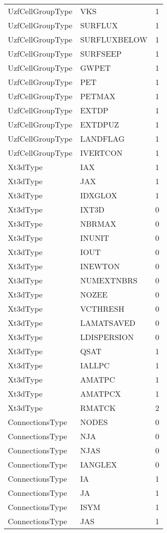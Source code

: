 \begin{longtable}{p{6cm} p{4cm} p{2cm} }
UzfCellGroupType &  VKS & 1 \\ 
UzfCellGroupType &  SURFLUX & 1 \\ 
UzfCellGroupType &  SURFLUXBELOW & 1 \\ 
UzfCellGroupType &  SURFSEEP & 1 \\ 
UzfCellGroupType &  GWPET & 1 \\ 
UzfCellGroupType &  PET & 1 \\ 
UzfCellGroupType &  PETMAX & 1 \\ 
UzfCellGroupType &  EXTDP & 1 \\ 
UzfCellGroupType &  EXTDPUZ & 1 \\ 
UzfCellGroupType &  LANDFLAG & 1 \\ 
UzfCellGroupType &  IVERTCON & 1 \\ 
Xt3dType &  IAX & 1 \\ 
Xt3dType &  JAX & 1 \\ 
Xt3dType &  IDXGLOX & 1 \\ 
Xt3dType &  IXT3D & 0 \\ 
Xt3dType &  NBRMAX & 0 \\ 
Xt3dType &  INUNIT & 0 \\ 
Xt3dType &  IOUT & 0 \\ 
Xt3dType &  INEWTON & 0 \\ 
Xt3dType &  NUMEXTNBRS & 0 \\ 
Xt3dType &  NOZEE & 0 \\ 
Xt3dType &  VCTHRESH & 0 \\ 
Xt3dType &  LAMATSAVED & 0 \\ 
Xt3dType &  LDISPERSION & 0 \\ 
Xt3dType &  QSAT & 1 \\ 
Xt3dType &  IALLPC & 1 \\ 
Xt3dType &  AMATPC & 1 \\ 
Xt3dType &  AMATPCX & 1 \\ 
Xt3dType &  RMATCK & 2 \\ 
ConnectionsType &  NODES & 0 \\ 
ConnectionsType &  NJA & 0 \\ 
ConnectionsType &  NJAS & 0 \\ 
ConnectionsType &  IANGLEX & 0 \\ 
ConnectionsType &  IA & 1 \\ 
ConnectionsType &  JA & 1 \\ 
ConnectionsType &  ISYM & 1 \\ 
ConnectionsType &  JAS & 1 \\ 

\end{longtable}
